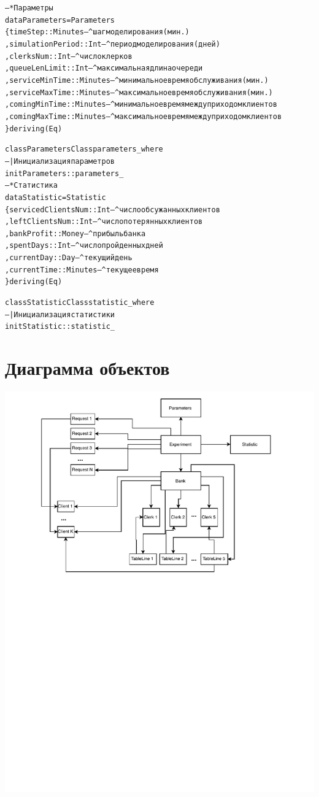 \documentclass[oneside,final,12pt]{article}
\begin{document}
\begin{alltt}
-- * Параметры
data Parameters = Parameters
\{ timeStep         :: Minutes -- ^ шаг моделирования (мин.)
	, simulationPeriod :: Int     -- ^ период моделирования (дней)
	, clerksNum        :: Int     -- ^ число клерков
	, queueLenLimit    :: Int     -- ^ максимальная длина очереди
	, serviceMinTime   :: Minutes -- ^ минимальное время обслуживания (мин.)
	, serviceMaxTime   :: Minutes -- ^ максимальное время обслуживания (мин.)
	, comingMinTime    :: Minutes -- ^ минимальное время между приходом клиентов
	, comingMaxTime    :: Minutes -- ^ максимальное время между приходом клиентов
\} deriving (Eq)

class ParametersClass parameters_ where
-- | Инициализация параметров
initParameters :: parameters_
 \\

-- * Статистика
data Statistic = Statistic
\{ servicedClientsNum   :: Int     -- ^ число обсужанных клиентов
	, leftClientsNum       :: Int     -- ^ число потерянных клиентов
	, bankProfit           :: Money   -- ^ прибыль банка
	, spentDays            :: Int     -- ^ число пройденных дней
	, currentDay           :: Day     -- ^ текущий день
	, currentTime          :: Minutes -- ^ текущее время
\} deriving (Eq)

class StatisticClass statistic_ where
-- | Инициализация статистики
initStatistic :: statistic_

\end{alltt}
\clearpage
\section{Диаграмма объектов}

\includegraphics[width=180mm]{objects.pdf}
\clearpage
\end{document}
